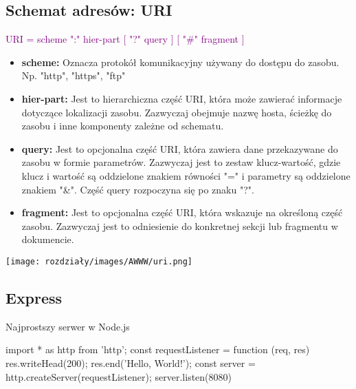 \subsection{Schemat adresów: URI}

\begin{center}
    \textcolor{purple}{URI = scheme ":" hier-part [ "?" query ] [ "\#" fragment ]}
\end{center}


\begin{itemize}[label=--]
  \item \textbf{scheme:} Oznacza protokół komunikacyjny używany do dostępu do zasobu. Np. "http", "https", "ftp"
  \item \textbf{hier-part:} Jest to hierarchiczna część URI, która może zawierać informacje dotyczące lokalizacji zasobu. Zazwyczaj obejmuje nazwę hosta, ścieżkę do zasobu i inne komponenty zależne od schematu. 
  \item \textbf{query:}  Jest to opcjonalna część URI, która zawiera dane przekazywane do zasobu w formie parametrów. Zazwyczaj jest to zestaw klucz-wartość, gdzie klucz i wartość są oddzielone znakiem równości "=" i parametry są oddzielone znakiem "\&". Część query rozpoczyna się po znaku "?".
  \item \textbf{fragment:} Jest to opcjonalna część URI, która wskazuje na określoną część zasobu. Zazwyczaj jest to odniesienie do konkretnej sekcji lub fragmentu w dokumencie.
\end{itemize}

\begin{example}
\begin{center}
    \texttt{[image: rozdziały/images/AWWW/uri.png]}    
\end{center}
\end{example}

\subsection{Express}

\begin{example}
Najprostszy serwer w Node.js
    \begin{js}
import * as http from 'http';
const requestListener = function (req, res) {
  res.writeHead(200);
  res.end('Hello, World!');
}
const server = http.createServer(requestListener);
server.listen(8080)
    \end{js}
\end{example}

